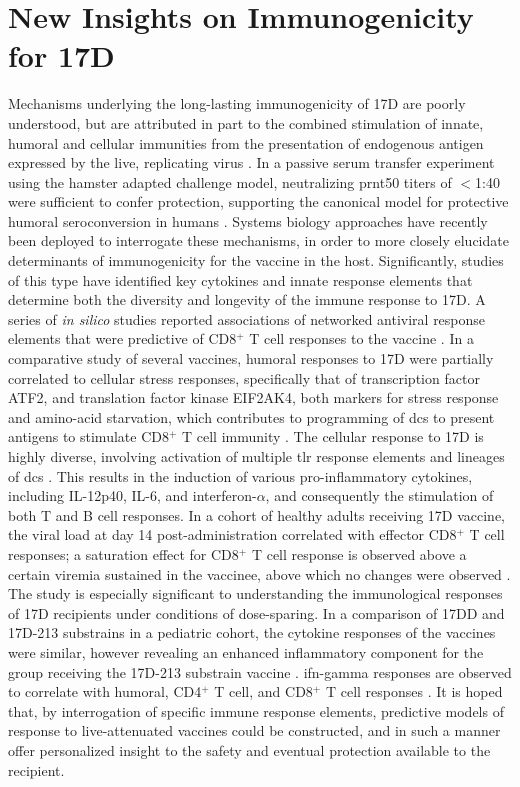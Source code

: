 \section{New Insights on Immunogenicity for 17D}
Mechanisms underlying the long-lasting immunogenicity of 17D are poorly understood, but are attributed in part to the combined stimulation of innate, humoral and cellular immunities from the presentation of endogenous antigen expressed by the live, replicating virus \parencite{Mudd:2010fm}. In a passive serum transfer experiment using the hamster adapted challenge model, neutralizing \gls{prnt50} titers of $<$1:40 were sufficient to confer protection, supporting the canonical model for protective humoral seroconversion in humans \parencite{Julander:2011hq}. Systems biology approaches have recently been deployed to interrogate these mechanisms, in order to more closely elucidate determinants of immunogenicity for the vaccine in the host. Significantly, studies of this type have identified key cytokines and innate response elements that determine both the diversity and longevity of the immune response to 17D. A series of \emph{in silico} studies reported associations of networked antiviral response elements that were predictive of CD8$^+$ T cell responses to the vaccine \parencite{Querec:2008jj}. In a comparative study of several vaccines, humoral responses to 17D were partially correlated to cellular stress responses, specifically that of transcription factor ATF2, and translation factor kinase EIF2AK4, both markers for stress response and amino-acid starvation, which contributes to programming of \glspl{dc} to present antigens to stimulate CD8$^+$ T cell immunity \parencite{Li:2014he}. The cellular response to 17D is highly diverse, involving activation of multiple \gls{tlr} response elements and lineages of \glspl{dc} \parencite{Gaucher:2008hm}. This results in the induction of various pro-inflammatory cytokines, including IL-12p40, IL-6, and interferon-$\alpha$, and consequently the stimulation of both T and B cell responses. In a cohort of healthy adults receiving 17D vaccine, the viral load at day 14 post-administration correlated with effector CD8$^+$ T cell responses; a saturation effect for CD8$^+$ T cell response is observed above a certain viremia sustained in the vaccinee, above which no changes were observed \parencite{Akondy:2015ks}. The study is especially significant to understanding the immunological responses of 17D recipients under conditions of dose-sparing. In a comparison of 17DD and 17D-213 substrains in a pediatric cohort, the cytokine responses of the vaccines were similar, however revealing an enhanced inflammatory component for the group receiving the 17D-213 substrain vaccine \parencite{CampiAzevedo:2012gt}. \Gls{ifn}-gamma responses are observed to correlate with humoral, CD4$^+$ T cell, and CD8$^+$ T cell responses \parencite{Neves:2010fa, Neves:2013ce}. It is hoped that, by interrogation of specific immune response elements, predictive models of response to live-attenuated vaccines could be constructed, and in such a manner offer personalized insight to the safety and eventual protection available to the recipient.


